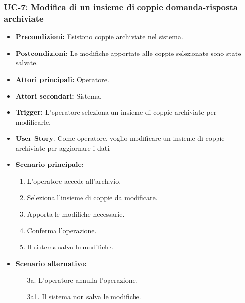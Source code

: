\documentclass[a4paper, 12pt]{article}
\begin{document}
\subsubsection{UC-7: Modifica di un insieme di coppie domanda-risposta archiviate}
\begin{itemize}
    \item \textbf{Precondizioni:} Esistono coppie archiviate nel sistema.
    \item \textbf{Postcondizioni:} Le modifiche apportate alle coppie selezionate sono state salvate.
    \item \textbf{Attori principali:} Operatore.
    \item \textbf{Attori secondari:} Sistema.
    \item \textbf{Trigger:} L'operatore seleziona un insieme di coppie archiviate per modificarle.
    \item \textbf{User Story:} Come operatore, voglio modificare un insieme di coppie archiviate per aggiornare i dati.
    \item \textbf{Scenario principale:}
    \begin{enumerate}
        \item L'operatore accede all'archivio.
        \item Seleziona l'insieme di coppie da modificare.
        \item Apporta le modifiche necessarie.
        \item Conferma l'operazione.
        \item Il sistema salva le modifiche.
    \end{enumerate}
    \item \textbf{Scenario alternativo:}
    \begin{enumerate}
        \item[3a.] L'operatore annulla l'operazione.
        \item[3a1.] Il sistema non salva le modifiche.
    \end{enumerate}
\end{itemize}
\end{document}
